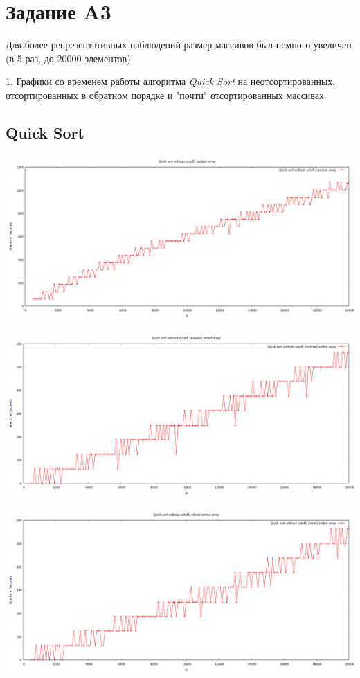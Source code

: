 \documentclass[11pt,a4paper]{article}
\begin{document}
\section*{Задание A3}

Для более репрезентативных наблюдений размер массивов был немного увеличен (в 5 раз, до 20000 элементов)

1. Графики со временем работы алгоритма \textit{Quick Sort} на неотсортированных, \\
отсортированных в обратном порядке и "почти" отсортированных массивах

\subsection*{Quick Sort}


\hspace*{-2cm} \includegraphics[scale=0.5]{quick_sort_random_arr.PNG}

\hspace*{-2cm} \includegraphics[scale=0.5]{quick_sort_reversed_arr.PNG}

\hspace*{-2cm} \includegraphics[scale=0.5]{quick_sort_almost_sorted_arr.PNG}
\end{document}
